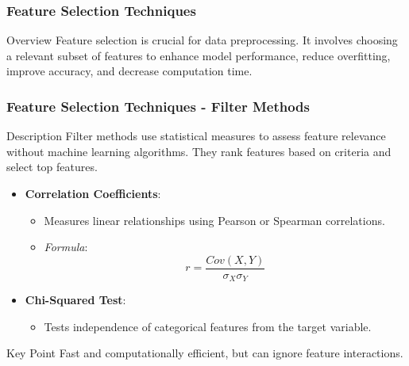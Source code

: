 \documentclass[aspectratio=169]{beamer}
\begin{document}
\begin{frame}[fragile]
    \frametitle{Feature Selection Techniques}
    \begin{block}{Overview}
        Feature selection is crucial for data preprocessing. It involves choosing a relevant subset of features to enhance model performance, reduce overfitting, improve accuracy, and decrease computation time. 
    \end{block}
\end{frame}

\begin{frame}[fragile]
    \frametitle{Feature Selection Techniques - Filter Methods}
    \begin{block}{Description}
        Filter methods use statistical measures to assess feature relevance without machine learning algorithms. They rank features based on criteria and select top features.
    \end{block}
    
    \begin{itemize}
        \item \textbf{Correlation Coefficients}:
        \begin{itemize}
            \item Measures linear relationships using Pearson or Spearman correlations.
            \item \textit{Formula}: 
            \begin{equation}
            r = \frac{Cov(X, Y)}{\sigma_X \sigma_Y}
            \end{equation}
        \end{itemize}
        
        \item \textbf{Chi-Squared Test}:
            \begin{itemize}
                \item Tests independence of categorical features from the target variable.
            \end{itemize}
    \end{itemize}

    \begin{block}{Key Point}
        Fast and computationally efficient, but can ignore feature interactions.
    \end{block}
\end{frame}
\end{document}
